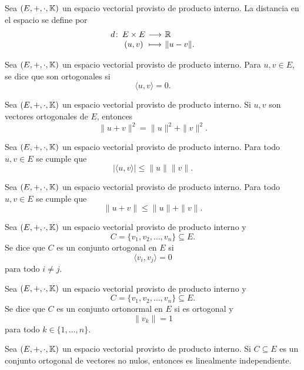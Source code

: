 \documentclass[a4,11pt]{aleph-notas}
\begin{document}
\begin{defi}
    Sea $(E,+,\cdot,\mathbb{K})$ un espacio vectorial provisto de producto interno. La distancia en el espacio se define por
    \[
        \funcion{d}{E\times E}{\R}{(u,v)}{\| u - v\|.}
    \]
\end{defi}


\begin{teo}
    Sea $(E,+,\cdot,\mathbb{K})$ un espacio vectorial provisto de producto interno. Para  $u,v\in E$, se dice que son ortogonales si
    \[
        \langle u , v \rangle = 0.
    \]
\end{teo}


\begin{teo}
    Sea $(E,+,\cdot,\mathbb{K})$ un espacio vectorial provisto de producto interno.
    Si $u,v$ son vectores ortogonales de $E$, entonces
    \[
        \| u + v \|^2 = \|u\|^2 + \|v\|^2.
    \]
\end{teo}

\begin{teo}
    Sea $(E,+,\cdot,\mathbb{K})$ un espacio vectorial provisto de producto interno.
    Para todo $u,v\in E$ se cumple que
    \[
        | \langle u , v \rangle | \leq \|u\|  \|v\|.
    \]
\end{teo}

\begin{teo}
    Sea $(E,+,\cdot,\mathbb{K})$ un espacio vectorial provisto de producto interno.
    Para todo $u,v\in E$ se cumple que
    \[
        \| u + v \| \leq \|u\| + \|v\|.
    \]
\end{teo}


\begin{defi}
    Sea $(E,+,\cdot,\mathbb{K})$ un espacio vectorial provisto de producto interno y
    \[C=\{v_1, v_2, \ldots, v_n\}\subseteq E.\] Se dice que $C$ es un conjunto ortogonal en $E$ si
    \[
        \langle v_i, v_j \rangle = 0
    \]
    para todo $i \neq j$.
\end{defi}

\begin{defi}
    Sea $(E,+,\cdot,\mathbb{K})$ un espacio vectorial provisto de producto interno y
    \[C = \{v_1, v_2, \ldots, v_n\} \subseteq E.\] Se dice que $C$ es un conjunto ortonormal en $E$ si es ortogonal y 
    \[
        \| v_k\| =  1
    \]
    para todo $k \in \{1, \ldots, n\}$.
\end{defi}


\begin{teo}
    Sea $(E,+,\cdot,\mathbb{K})$ un espacio vectorial provisto de producto interno. Si $C \subseteq E$ es un conjunto ortogonal de vectores no nulos, entonces es linealmente independiente.
\end{teo}
\end{document}
